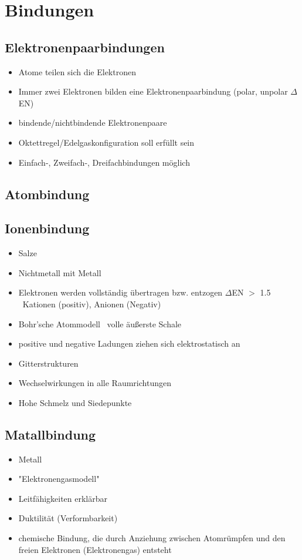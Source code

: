 
\section{Bindungen}

\subsection{Elektronenpaarbindungen}
\begin{itemize}
    \item Atome teilen sich die Elektronen
    \item Immer zwei Elektronen bilden eine Elektronenpaarbindung (polar, unpolar $\Delta$EN)
    \item bindende/nichtbindende Elektronenpaare
    \item Oktettregel/Edelgaskonfiguration soll erfüllt sein
    \item Einfach-, Zweifach-, Dreifachbindungen möglich
\end{itemize}

\subsection{Atombindung}

\subsection{Ionenbindung}
\begin{itemize}
    \item Salze
    \item Nichtmetall mit Metall
    \item Elektronen werden vollständig übertragen bzw. entzogen $\Delta$EN $>$ 1.5 \\
        \textrightarrow\ Kationen (positiv), Anionen (Negativ)
    \item Bohr'sche Atommodell \textrightarrow\ volle äußerste Schale
    \item positive und negative Ladungen ziehen sich elektrostatisch an
    \item Gitterstrukturen
    \item Wechselwirkungen in alle Raumrichtungen
    \item Hohe Schmelz und Siedepunkte
\end{itemize}

\subsection{Matallbindung}
\begin{itemize}
    \item Metall
    \item "Elektronengasmodell"
    \item Leitfähigkeiten erklärbar
    \item Duktilität (Verformbarkeit)
    \item chemische Bindung, die durch Anziehung zwischen Atomrümpfen und den freien Elektronen (Elektronengas) entsteht
\end{itemize}

